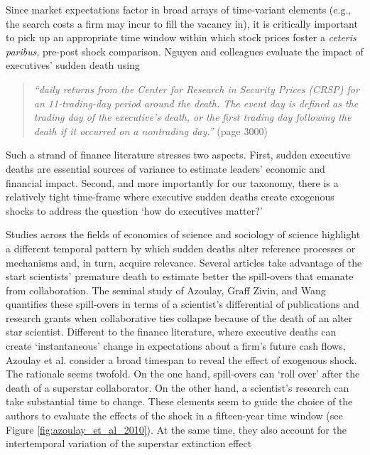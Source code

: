\documentclass[11pt]{article}
\begin{document}
\begin{refsection}
Since market expectations factor in broad arrays of time-variant elements (e.g.,
the search costs a firm may incur to fill the vacancy in), it is critically
important to pick up an appropriate time window within which stock prices foster
a \textit{ceteris paribus}, pre-post shock comparison. Nguyen and colleagues
\autocite*[][]{nguyen_et_al_2014} evaluate the impact of executives' sudden
death using 

\begin{quote}
  \textit{
    ``daily returns from the Center for Research in Security Prices (CRSP) for
    an 11-trading-day period around the death. The event day is defined as the
    trading day of the executive's death, or the first trading day following
    the death if it occurred on a nontrading day.''
  }
  (page 3000)
\end{quote}

Such a strand of finance literature stresses two aspects. First, sudden
executive deaths are essential sources of variance to estimate leaders' economic
and financial impact.  Second, and more importantly for our taxonomy, there is a
relatively tight time-frame where executive sudden deaths create exogenous
shocks to address the question `how do executives matter?'

Studies across the fields of economics of science and sociology of science
highlight a different temporal pattern by which sudden deaths alter reference
processes or mechanisms and, in turn, acquire relevance. Several articles
\autocites[e.g.,][]{azoulay_et_al_2019_b,azoulay_et_al_2019_a,khanna_et_al_2021,
aizenam_kletzer_2011,azoulay_et_al_2010,oettl_2012} take advantage of the start
scientists' premature death to estimate better the spill-overs that emanate from
collaboration. The seminal study of Azoulay, Graff Zivin, and Wang 
\autocite*{azoulay_et_al_2010} quantifies these spill-overs in terms of a
scientist's differential of publications and research grants when collaborative
ties collapse because of the death of an alter star scientist. Different to the
finance literature, where executive deaths can create `instantaneous' change in
expectations about a firm's future cash flows, Azoulay et al.
\autocite*{azoulay_et_al_2010} consider a broad timespan to reveal the effect of
exogenous shock. The rationale seems twofold. On the one hand, spill-overs can
`roll over' after the death of a superstar collaborator.  On the other hand, a
scientist's research can take substantial time to change.  These elements seem
to guide the choice of the authors to evaluate the effects of the shock in a
fifteen-year time window (see Figure \ref{fig:azoulay_et_al_2010}). At the same
time, they also account for the intertemporal variation of the superstar
extinction effect


\end{refsection}
\end{document}
